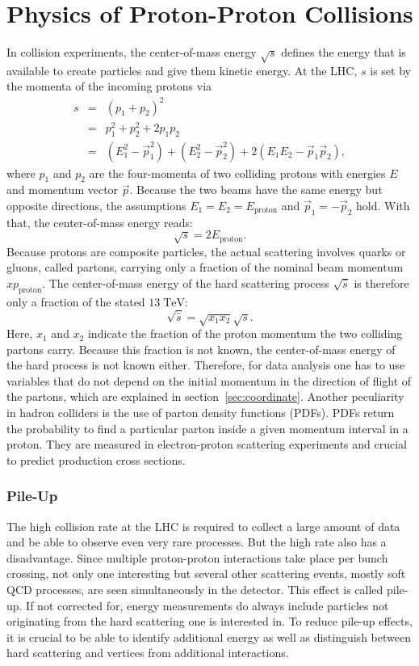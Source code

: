 \section{Physics of Proton-Proton Collisions}
	In collision experiments, the center-of-mass energy $\sqrt{s}$ defines the energy that is available to create particles and give them kinetic energy. At the LHC, $s$ is set by the momenta of the incoming protons via
	\begin{eqnarray}
	s &=& (p_1 + p_2)^2 \\
	  &=& p_1^2 + p_2^2 + 2 p_1 p_2 \\
	  &=& (E_1^2 - \vec{p}_1^2 )  + (E_2^2 - \vec{p}_2^2 ) + 2 (E_1 E_2 - \vec{p}_1 \vec{p}_2 ),
	\end{eqnarray}
	where $p_1$ and $p_2$ are the four-momenta of two colliding protons with energies $E$ and momentum vector $\vec{p}$. Because the two beams have the same energy but opposite directions, the assumptions $E_1 = E_2 = E_\text{proton}$ and $\vec{p}_1 = -\vec{p}_2$ hold. With that, the center-of-mass energy reads:
	\begin{equation}
	\sqrt{s} = 2 E_\text{proton}.
	\end{equation}
	Because protons are composite particles, the actual scattering involves quarks or gluons, called partons, carrying only a fraction of the nominal beam momentum $x p_\text{proton}$. The center-of-mass energy of the hard scattering process $\sqrt{\hat{s}}$ is therefore only a fraction of the stated $13\;\text{TeV}$:
	\begin{equation}
	\sqrt{\hat{s}} = \sqrt{x_1 x_2} \sqrt{s}.
	\end{equation} 
	Here, $x_1$ and $x_2$ indicate the fraction of the proton momentum the two colliding partons carry. Because this fraction is not known, the center-of-mass energy of the hard process is not known either. Therefore, for data analysis one has to use variables that do not depend on the initial momentum in the direction of flight of the partons, which are explained in section~\ref{sec:coordinate}. Another peculiarity in hadron colliders is the use of parton density functions (PDFs). PDFs return the probability to find a particular parton inside a given momentum interval in a proton. They are measured in electron-proton scattering experiments \cite{pdf} and crucial to predict production cross sections.
		
\subsubsection{Pile-Up}
	The high collision rate at the LHC is required to collect a large amount of data and be able to observe even very rare processes. But the high rate also has a disadvantage. Since multiple proton-proton interactions take place per bunch crossing, not only one interesting but several other scattering events, mostly soft QCD processes, are seen simultaneously in the detector. This effect is called pile-up. If not corrected for, energy measurements do always include particles not originating from the hard scattering one is interested in. To reduce pile-up effects, it is crucial to be able to identify additional energy as well as distinguish between hard scattering and vertices from additional interactions.
	

